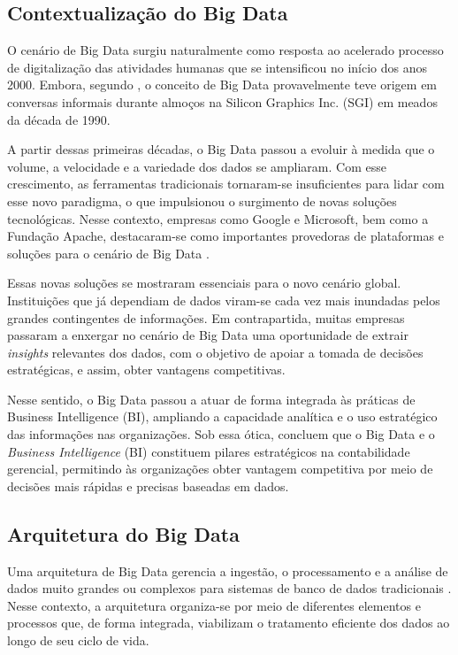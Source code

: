 \subsection{Contextualização do Big Data}

O cenário de Big Data surgiu naturalmente como resposta ao acelerado processo de digitalização
das atividades humanas que se intensificou no início dos anos 2000. Embora, segundo 
, o conceito de Big Data provavelmente teve origem em conversas informais 
durante almoços na Silicon Graphics Inc. (SGI) em meados da década de 1990.

A partir dessas primeiras décadas, o Big Data passou a evoluir à medida que o volume, a 
velocidade e a variedade dos dados se ampliaram. Com esse crescimento, as ferramentas 
tradicionais tornaram-se insuficientes para lidar com esse novo paradigma, o que impulsionou 
o surgimento de novas soluções tecnológicas. Nesse contexto, empresas como Google e 
Microsoft, bem como a Fundação Apache, destacaram-se como importantes provedoras de 
plataformas e soluções para o cenário de Big Data \cite{khamaru2022dynamics}.

Essas novas soluções se mostraram essenciais para o novo cenário global. Instituições que 
já dependiam de dados viram-se cada vez mais inundadas pelos grandes contingentes de 
informações. Em contrapartida, muitas empresas passaram a enxergar no cenário de Big Data 
uma oportunidade de extrair \textit{insights} relevantes dos dados, com o objetivo de apoiar a tomada 
de decisões estratégicas, e assim, obter vantagens competitivas.

Nesse sentido, o Big Data passou a atuar de forma integrada às práticas de Business 
Intelligence (BI), ampliando a capacidade analítica e o uso estratégico das informações 
nas organizações. Sob essa ótica,  concluem que o Big 
Data e o \textit{Business Intelligence} (BI) constituem pilares estratégicos na contabilidade gerencial, 
permitindo às organizações obter vantagem competitiva por meio de decisões mais rápidas e 
precisas baseadas em dados.

\subsection{Arquitetura do Big Data}

Uma arquitetura de Big Data gerencia a ingestão, o processamento e a análise de dados muito 
grandes ou complexos para sistemas de banco de dados tradicionais \cite{microsoft2025bigdata}. 
Nesse contexto, a arquitetura organiza-se por meio de diferentes elementos e processos que, 
de forma integrada, viabilizam o tratamento eficiente dos dados ao longo de seu ciclo de vida.

